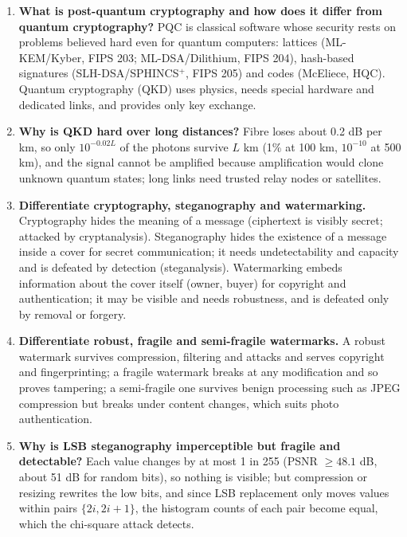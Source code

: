 \begin{enumerate}[leftmargin=1.6em,itemsep=3pt]
  \item \textbf{What is post-quantum cryptography and how does it differ from quantum cryptography?} PQC is classical software whose security rests on problems believed hard even for quantum computers: lattices (ML-KEM/Kyber, FIPS 203; ML-DSA/Dilithium, FIPS 204), hash-based signatures (SLH-DSA/SPHINCS$^+$, FIPS 205) and codes (McEliece, HQC). Quantum cryptography (QKD) uses physics, needs special hardware and dedicated links, and provides only key exchange.
  \item \textbf{Why is QKD hard over long distances?} Fibre loses about 0.2 dB per km, so only $10^{-0.02L}$ of the photons survive $L$ km (1\% at 100 km, $10^{-10}$ at 500 km), and the signal cannot be amplified because amplification would clone unknown quantum states; long links need trusted relay nodes or satellites.
  \item \textbf{Differentiate cryptography, steganography and watermarking.} Cryptography hides the meaning of a message (ciphertext is visibly secret; attacked by cryptanalysis). Steganography hides the existence of a message inside a cover for secret communication; it needs undetectability and capacity and is defeated by detection (steganalysis). Watermarking embeds information about the cover itself (owner, buyer) for copyright and authentication; it may be visible and needs robustness, and is defeated only by removal or forgery.
  \item \textbf{Differentiate robust, fragile and semi-fragile watermarks.} A robust watermark survives compression, filtering and attacks and serves copyright and fingerprinting; a fragile watermark breaks at any modification and so proves tampering; a semi-fragile one survives benign processing such as JPEG compression but breaks under content changes, which suits photo authentication.
  \item \textbf{Why is LSB steganography imperceptible but fragile and detectable?} Each value changes by at most 1 in 255 (PSNR $\ge 48.1$ dB, about 51 dB for random bits), so nothing is visible; but compression or resizing rewrites the low bits, and since LSB replacement only moves values within pairs $\{2i, 2i+1\}$, the histogram counts of each pair become equal, which the chi-square attack detects.
\end{enumerate}

